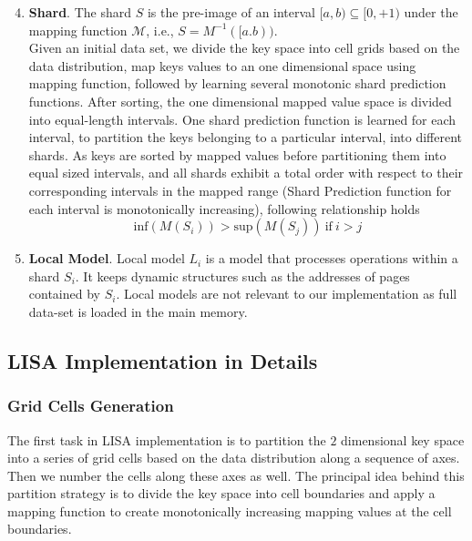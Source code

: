 \begin{enumerate}
\setcounter{enumi}{3}
	\item \textbf{Shard}. The shard $S$ is the pre-image of an
interval $[a, b) \subseteq [0, +1)$ under the mapping function $\mathcal{M}$,  i.e., $S = M^{-1}([a.b))$. \\
Given an initial data set, we divide the key space into cell grids based on the data distribution, map keys values to an one dimensional space using mapping function, followed by learning several monotonic shard prediction functions. After sorting, the one dimensional mapped value space is divided into equal-length intervals. One shard prediction function is learned for each interval, to partition the keys belonging to a particular interval, into different shards. As keys are sorted by mapped values before partitioning them into equal sized intervals, and all shards exhibit a total order with respect to their corresponding intervals in the mapped range (Shard Prediction function for each interval is monotonically increasing), following relationship holds
$$ \text{inf} (M(S_{i}))  > \text{sup} (M(S_{j}))\: \text{if}\: i > j$$

\item \textbf{Local Model}. Local model $L_{i}$ is a model that processes operations within a shard $S_i$. It keeps dynamic structures such as the addresses of pages contained by $S_{i}$. Local models are not relevant to our implementation as full data-set is loaded in the main memory.
\end{enumerate}

\subsection{LISA Implementation in Details}
\subsubsection{Grid Cells Generation}
The first task in LISA implementation is to partition the $2$ dimensional key space into a series of grid cells based on the data distribution along a sequence of axes. Then we number the cells along these axes as well. The principal idea behind this partition strategy is to divide the key space into cell boundaries and apply a mapping function to create monotonically increasing mapping values at the cell boundaries. 


